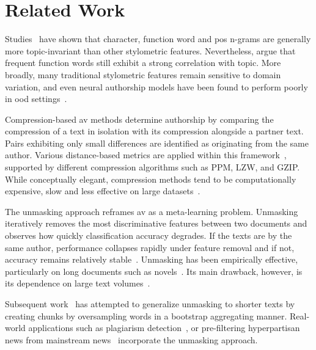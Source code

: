 \label{chap:related_work}
\chapter{Related Work}





Studies~\citep{stamatatos_survey_2009,barlas_cross_domain_2020} have shown that character, function word and \ac{pos} n-grams are generally more topic-invariant than other stylometric features.
Nevertheless, \citet{bischoff_importance_2020} argue that frequent function words still exhibit a strong correlation with topic.
More broadly, many traditional stylometric features remain sensitive to domain variation, and even neural authorship models have been found to perform poorly in \ac{ood} settings~\citep{rivera_soto_learning_2021}.

Compression-based \ac{av} methods determine authorship by comparing the compression of a text in isolation with its compression alongside a partner text. 
Pairs exhibiting only small differences are identified as originating from the same author.
Various distance-based metrics are applied within this framework~\citep{elmanarelbouanani_authorship_2014,bevendorff_divergence_based_2020,bevendorff_overview_2024}, supported by different compression algorithms such as PPM, LZW, and GZIP. 
While conceptually elegant, compression methods tend to be computationally expensive, slow and less effective on large datasets~\citep{tyo_state_2022,neal_surveying_2018}. 

The unmasking approach reframes \ac{av} as a meta-learning problem. 
Unmasking iteratively removes the most discriminative features between two documents and observes how quickly classification accuracy degrades. 
If the texts are by the same author, performance collapses rapidly under feature removal and if not, accuracy remains relatively stable~\citep{koppel_authorship_2004}. 
Unmasking has been empirically effective, particularly on long documents such as novels~\citep{koppel_authorship_2011}. 
Its main drawback, however, is its dependence on large text volumes~\citep{koppel_determining_2014,bevendorff_generalizing_2019}.

Subsequent work~\citep{bevendorff_generalizing_2019,bevendorff_divergence_based_2020} has attempted to generalize unmasking to shorter texts by creating chunks by oversampling words in a bootstrap aggregating manner. 
Real-world applications such as plagiarism detection~\citep{stein_intrinsic_2011}, or pre-filtering hyperpartisan news from mainstream news~\citep{potthast_stylometric_2018} incorporate the unmasking approach.


